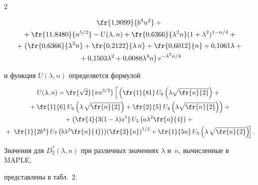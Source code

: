 \begin{multicols}{2}
{\begin{multline*}
\fr{1{,}9099}{b^4n^2}+{}\\


{}+\fr{11{,}8480}{n^{5/2}} -U(\lambda,n)


+\fr{0{,}6366}{\lambda^2 n} (1+\lambda^2)^{1-n/4}


+{}\\


{}+\left(\fr{0{,}6366}{\lambda^2 n}+


\fr{0{,}2122}{\lambda \,n}+


\fr{0{,}6012 }{n}+ 0{,}1061\lambda + {}\right.\\


\left.{}+0{,}1503 \lambda^2 +0{,}0088 \lambda^4 n


\vphantom{\fr{0{,}}{0{,}}}\right)e^{-\lambda^2 n/4}


\end{multline*}


и функция $U(\lambda,n)$ определяется формулой}


\begin{multline*} %


 U(\lambda,n)  = \fr{\sqrt{2}}{\pi n^{3/2}}\left[ 


 \vphantom{\left(\fr{1}{2}\right)^1}


 \left(\fr{1}{81}\,U_8\left(\lambda \sqrt{\fr{n}{2}}\right) + {}\right.\right.\\


\left. {}+


 \fr{1}{6}\, U_6\left(\lambda\,\sqrt{\fr{n}{2}}\right) + \fr{2}{5}\, U_4\left(\lambda \sqrt{\fr{n}{2}}\right) \right)+{}\\


{} + \left(\fr{4}{3(1-\lambda)a^3}\, U_5\left(a\lambda^2 \fr{n}{4}\right) + {}\right.\\


{}+\left.\left.\fr{1}{2b^4}\, 


U_7\left(b \lambda^2 \fr{n}{4}\right)\right)\!\left(\fr{2}{n}\right)^{1/2} 


+ \fr{1}{5 n}\, U_8\left(\lambda\,\sqrt{\fr{n}{2}}\right) \!\right].


\end{multline*}





Значения для $D_2^*(\lambda,n)$ при различных значениях  $\lambda$ и~$n$, вычисленные в    MAPLE,


представлены в табл.~2.






\end{multicols}
